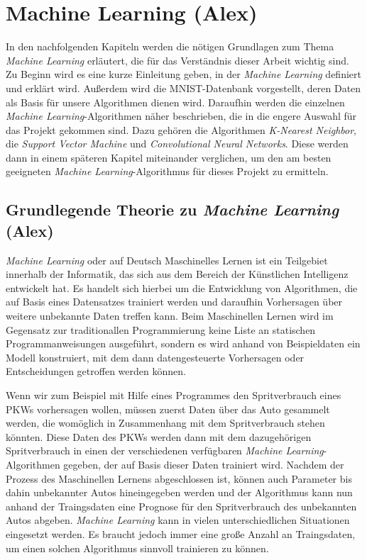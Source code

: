 \section{Machine Learning (Alex)}
In den nachfolgenden Kapiteln werden die nötigen Grundlagen zum Thema \textit{Machine Learning} erläutert, die für das Verständnis dieser Arbeit wichtig sind.
Zu Beginn wird es eine kurze Einleitung geben, in der \textit{Machine Learning} definiert und erklärt wird. Außerdem wird die MNIST-Datenbank vorgestellt, deren
Daten als Basis für unsere Algorithmen dienen wird. Daraufhin werden die einzelnen \textit{Machine Learning}-Algorithmen näher beschrieben, die in die engere
Auswahl für das Projekt gekommen sind. Dazu gehören die Algorithmen \textit{K-Nearest Neighbor}, die \textit{Support Vector Machine} und \textit{Convolutional
Neural Networks}. Diese werden dann in einem späteren Kapitel miteinander verglichen, um den am besten geeigneten \textit{Machine Learning}-Algorithmus 
für dieses Projekt zu ermitteln.

\subsection{Grundlegende Theorie zu \textit{Machine Learning} (Alex)}
\textit{Machine Learning} oder auf Deutsch Maschinelles Lernen ist ein Teilgebiet innerhalb der Informatik, das sich aus dem Bereich der Künstlichen Intelligenz
entwickelt hat. Es handelt sich hierbei um die Entwicklung von Algorithmen, die auf Basis eines Datensatzes trainiert werden und daraufhin Vorhersagen über
weitere unbekannte Daten treffen kann. Beim Maschinellen Lernen wird im Gegensatz zur traditionallen Programmierung keine Liste an statischen Programmanweisungen
ausgeführt, sondern es wird anhand von Beispieldaten ein Modell konstruiert, mit dem dann datengesteuerte Vorhersagen oder Entscheidungen getroffen werden
können.\cite{simon_2015}

Wenn wir zum Beispiel mit Hilfe eines Programmes den Spritverbrauch eines PKWs vorhersagen wollen, müssen zuerst Daten über das Auto gesammelt werden, die womöglich
in Zusammenhang mit dem Spritverbrauch stehen könnten. Diese Daten des PKWs werden dann mit dem dazugehörigen Spritverbrauch in einen der verschiedenen verfügbaren 
\textit{Machine Learning}-Algorithmen gegeben, der auf Basis dieser Daten trainiert wird. 
Nachdem der Prozess des Maschinellen Lernens abgeschlossen ist, können auch Parameter bis dahin unbekannter Autos hineingegeben werden und der Algorithmus kann nun
anhand der Traingsdaten eine Prognose für den Spritverbrauch des unbekannten Autos abgeben.
\textit{Machine Learning} kann in vielen unterschiedlichen Situationen eingesetzt werden. Es braucht jedoch immer eine große Anzahl an Traingsdaten, um einen
solchen Algorithmus sinnvoll trainieren zu können.

